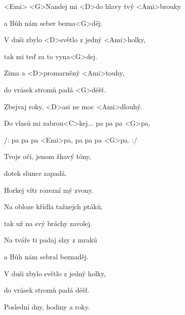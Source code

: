 

<Emi>
\zs
<G>Nandej mi <D>do hlavy tvý <Ami>brouky

a Bůh nám seber bezna<G>děj.

V duši zbylo <D>světlo z jedný <Ami>holky,

tak mi teď za to vyna<G>dej.

Zima a <D>promarněný <Ami>touhy,

do vrásek stromů padá <G>déšť.

Zbejvaj roky, <D>asi ne moc <Ami>dlouhý.

\ks
\zr

Do vlasů mi zabrou<C>kej... pa pa pa <G>pa,

/: pa pa pa <Emi>pa, pa pa pa <G>pa. :/
\kr

\zs
Tvoje oči, jenom žhavý tóny,

dotek slunce zapadá.

Horkej vítr rozezní mý zvony.

\ks
\zr \kr

\zs
Na obloze křídla tažnejch ptáků,

tak už na svý bráchy zavolej.

Na tváře ti padaj slzy z mraků

a Bůh nám sebral beznaděj.

V duši zbylo světlo z jedný holky,

do vrásek stromů padá déšť.

Poslední dny, hodiny a roky.

\ks

\zr
\kr

\kp





